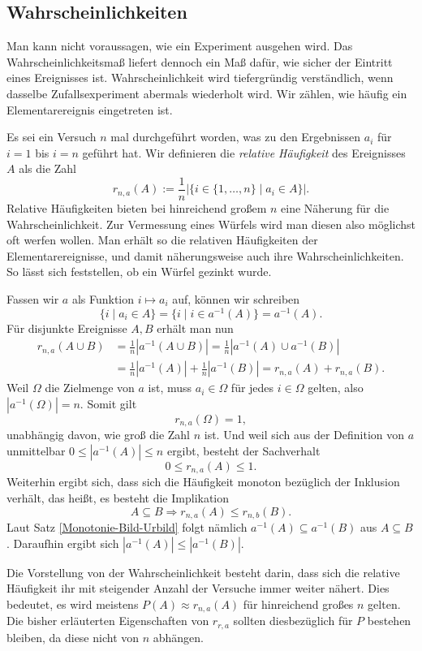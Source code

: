 \subsection{Wahrscheinlichkeiten}

Man kann nicht voraussagen, wie ein Experiment ausgehen wird. Das
Wahrscheinlichkeitsmaß liefert dennoch ein Maß dafür, wie sicher der
Eintritt eines Ereignisses ist. Wahrscheinlichkeit wird tiefergründig
verständlich, wenn dasselbe Zufallsexperiment abermals wiederholt wird.
Wir zählen, wie häufig ein Elementarereignis eingetreten ist.

Es sei ein Versuch $n$ mal durchgeführt worden, was zu den Ergebnissen
$a_i$ für $i=1$ bis $i=n$ geführt hat. Wir definieren die \emph{relative
Häufigkeit}
des Ereignisses $A$ als die Zahl
\[r_{n,a}(A) := \frac{1}{n}|\{i\in\{1,\ldots,n\}\mid a_i\in A\}|.\]
Relative Häufigkeiten bieten bei hinreichend großem $n$ eine Näherung
für die Wahrscheinlichkeit. Zur Vermessung eines Würfels wird man
diesen also möglichst oft werfen wollen. Man erhält so die relativen
Häufigkeiten der Elementarereignisse, und damit näherungsweise auch
ihre Wahrscheinlichkeiten. So lässt sich feststellen, ob ein
Würfel gezinkt wurde.

Fassen wir $a$ als Funktion $i\mapsto a_i$ auf, können wir schreiben
\[\{i\mid a_i\in A\} = \{i\mid i\in a^{-1}(A)\} = a^{-1}(A).\]
Für disjunkte Ereignisse $A,B$ erhält man nun
\begin{align*}
r_{n,a}(A\cup B) &= \tfrac{1}{n}|a^{-1}(A\cup B)|
= \tfrac{1}{n}|a^{-1}(A)\cup a^{-1}(B)|\\
&= \tfrac{1}{n}|a^{-1}(A)| + \tfrac{1}{n}|a^{-1}(B)|
= r_{n,a}(A) + r_{n,a}(B).
\end{align*}
Weil $\Omega$ die Zielmenge von $a$ ist, muss $a_i\in\Omega$
für jedes $i\in\Omega$ gelten, also $|a^{-1}(\Omega)|=n$. Somit gilt
\[r_{n,a}(\Omega) = 1,\]
unabhängig davon, wie groß die Zahl $n$ ist. Und weil sich aus der
Definition von $a$ unmittelbar $0\le |a^{-1}(A)|\le n$ ergibt, besteht der
Sachverhalt
\[0\le r_{n,a}(A)\le 1.\]
Weiterhin ergibt sich, dass sich die Häufigkeit monoton bezüglich der
Inklusion verhält, das heißt, es besteht die Implikation
\[A\subseteq B\Rightarrow r_{n,a}(A)\le r_{n,b}(B).\]
Laut Satz \ref{Monotonie-Bild-Urbild} folgt nämlich $a^{-1}(A)\subseteq a^{-1}(B)$
aus $A\subseteq B$. Daraufhin ergibt sich $|a^{-1}(A)|\le |a^{-1}(B)|$.

Die Vorstellung von der Wahrscheinlichkeit
besteht darin, dass sich die relative Häufigkeit ihr mit steigender
Anzahl der Versuche immer weiter nähert. Dies bedeutet, es wird meistens
$P(A)\approx r_{n,a}(A)$ für hinreichend großes $n$ gelten. Die bisher
erläuterten Eigenschaften von $r_{r,a}$ sollten diesbezüglich für $P$
bestehen bleiben, da diese nicht von $n$ abhängen.

